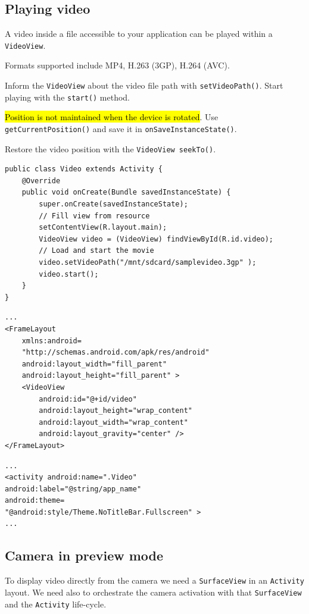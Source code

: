 \subsection{Playing video}
A video inside a file accessible to your application can be played within a \texttt{VideoView}.

Formats supported include MP4, H.263 (3GP), H.264 (AVC).

Inform the \texttt{VideoView} about the video file path with \texttt{setVideoPath()}.
Start playing with the \texttt{start()} method. 

\hl{Position is not maintained when the device is rotated}. 
Use \texttt{getCurrentPosition()} and save it in \texttt{onSaveInstanceState()}.

Restore the video position with the \texttt{VideoView seekTo()}.

\begin{lstlisting}
public class Video extends Activity {
    @Override
    public void onCreate(Bundle savedInstanceState) {
        super.onCreate(savedInstanceState);
        // Fill view from resource
        setContentView(R.layout.main);
        VideoView video = (VideoView) findViewById(R.id.video);
        // Load and start the movie
        video.setVideoPath("/mnt/sdcard/samplevideo.3gp" );
        video.start();
    }
}
\end{lstlisting}

\begin{lstlisting}[title=XML]
    ...
<FrameLayout
    xmlns:android=
    "http://schemas.android.com/apk/res/android"
    android:layout_width="fill_parent"
    android:layout_height="fill_parent" >
    <VideoView
        android:id="@+id/video"
        android:layout_height="wrap_content"
        android:layout_width="wrap_content"
        android:layout_gravity="center" />
</FrameLayout>

\end{lstlisting}

\begin{lstlisting}[title=Manifest]
...
<activity android:name=".Video"
android:label="@string/app_name"
android:theme=
"@android:style/Theme.NoTitleBar.Fullscreen" >
...
\end{lstlisting}

\subsection{Camera in preview mode}

To display video directly from the camera we need a \texttt{SurfaceView} 
in an \texttt{Activity} layout. 
We need also to orchestrate the camera activation with that \texttt{SurfaceView}
and the \texttt{Activity} life-cycle.

